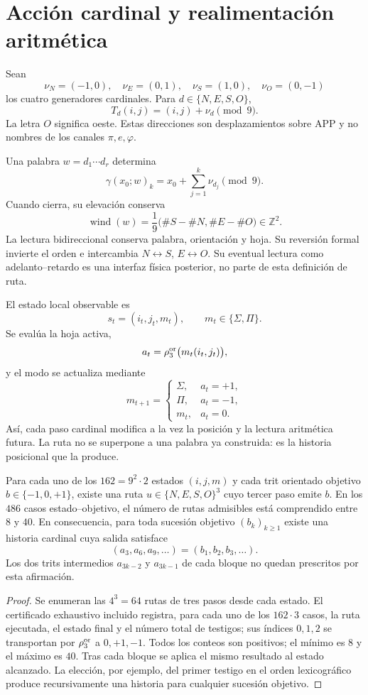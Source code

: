 \fi

\section{Acción cardinal y realimentación aritmética}

Sean
\[
 \nu_N=(-1,0),\quad \nu_E=(0,1),\quad
 \nu_S=(1,0),\quad \nu_O=(0,-1)
\]
los cuatro generadores cardinales. Para \(d\in\{N,E,S,O\}\),
\[
 T_d(i,j)=(i,j)+\nu_d\pmod9.
\]
La letra \(O\) significa oeste. Estas direcciones son desplazamientos sobre
APP y no nombres de los canales \(\pi,e,\varphi\).

Una palabra \(w=d_1\cdots d_r\) determina
\[
 \gamma(x_0;w)_k=x_0+\sum_{j=1}^{k}\nu_{d_j}\pmod9.
\]
Cuando cierra, su elevaci\'on conserva
\[
 \operatorname{wind}(w)=\frac1{9}
 \bigl(\#S-\#N,\#E-\#O\bigr)\in\mathbb Z^2.
\]
La lectura bidireccional conserva palabra, orientaci\'on y hoja. Su
reversi\'on formal invierte el orden e intercambia
\(N\leftrightarrow S\), \(E\leftrightarrow O\). Su eventual lectura como
adelanto--retardo es una interfaz f\'isica posterior, no parte de esta
definici\'on de ruta.

El estado local observable es
\[
 s_t=(i_t,j_t,m_t),
 \qquad m_t\in\{\Sigma,\Pi\}.
\]
Se eval\'ua la hoja activa,
\[
 a_t=\rho_3^{\rm or}\bigl(m_t(i_t,j_t)\bigr),
\]
y el modo se actualiza mediante
\[
 m_{t+1}=
 \begin{cases}
 \Sigma,&a_t=+1,\\
 \Pi,&a_t=-1,\\
 m_t,&a_t=0.
 \end{cases}
\]
As\'i, cada paso cardinal modifica a la vez la posici\'on y la lectura
aritm\'etica futura. La ruta no se superpone a una palabra ya construida: es
la historia posicional que la produce.

\begin{theorem}
Para cada uno de los \(162=9^2\cdot2\) estados \((i,j,m)\) y cada trit
orientado objetivo \(b\in\{-1,0,+1\}\), existe una ruta
\(u\in\{N,E,S,O\}^3\) cuyo tercer paso emite \(b\). En los \(486\) casos
estado--objetivo, el n\'umero de rutas admisibles est\'a comprendido entre
\(8\) y \(40\). En consecuencia, para toda sucesi\'on objetivo
\((b_k)_{k\geq1}\) existe una historia cardinal cuya salida satisface
\[
 (a_3,a_6,a_9,\ldots)=(b_1,b_2,b_3,\ldots).
\]
Los dos trits intermedios \(a_{3k-2}\) y \(a_{3k-1}\) de cada bloque no
quedan prescritos por esta afirmaci\'on.
\end{theorem}
\begin{proof}
Se enumeran las \(4^3=64\) rutas de tres pasos desde cada estado. El
certificado exhaustivo incluido registra, para cada uno de los
\(162\cdot3\) casos, la ruta ejecutada, el estado final y el n\'umero total de
testigos; sus índices \(0,1,2\) se transportan por
\(\rho_3^{\rm or}\) a \(0,+1,-1\). Todos los conteos son positivos; el
m\'inimo es \(8\) y el m\'aximo es \(40\). Tras cada bloque se aplica el mismo
resultado al estado alcanzado.
La elecci\'on, por ejemplo, del primer testigo en el orden lexicogr\'afico
produce recursivamente una historia para cualquier sucesi\'on objetivo.
\end{proof}

